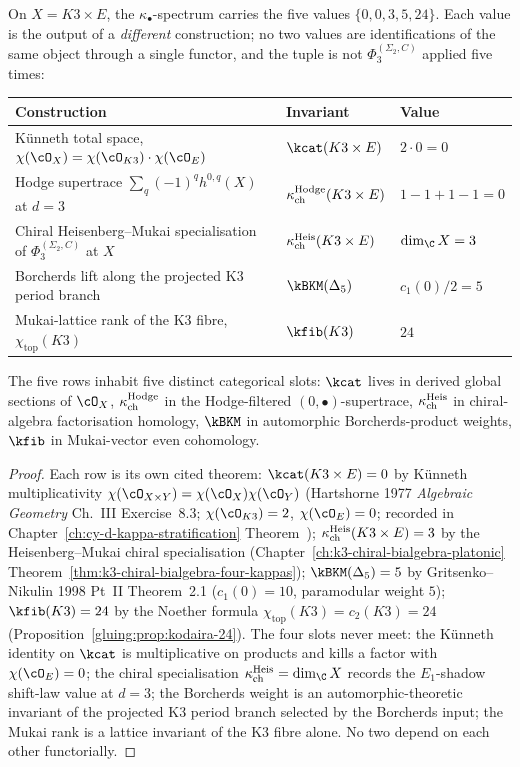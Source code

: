 \begin{theorem}
\label{gluing:thm:four-kappa-spectrum}
On $X = K3 \times E$, the $\kappa_{\bullet}$-spectrum carries the
five values $\{0, 0, 3, 5, 24\}$. Each value is the output of a
\emph{different} construction; no two values are identifications of
the same object through a single functor, and the tuple is not
$\Phi_3^{(\Sigma_2, C)}$ applied five times:
\begin{center}
\begin{tabular}{|l|l|l|}
\hline
Construction & Invariant & Value \\ \hline
K\"unneth total space, $\chi(\cO_X) = \chi(\cO_{K3}) \cdot
\chi(\cO_E)$ & $\kcat(K3 \times E)$ & $2 \cdot 0 = 0$ \\
Hodge supertrace $\sum_q (-1)^q h^{0,q}(X)$ at $d = 3$ &
$\kappa_{\mathrm{ch}}^{\mathrm{Hodge}}(K3 \times E)$ & $1 - 1 + 1 - 1 = 0$ \\
Chiral Heisenberg--Mukai specialisation of $\Phi_3^{(\Sigma_2, C)}$ at $X$ &
$\kappa_{\mathrm{ch}}^{\mathrm{Heis}}(K3 \times E)$ & $\dim_\C X = 3$ \\
Borcherds lift along the projected K3 period branch &
$\kBKM(\Delta_5)$ & $c_1(0)/2 = 5$ \\
Mukai-lattice rank of the K3 fibre, $\chi_{\mathrm{top}}(K3)$ &
$\kfib(K3)$ & $24$ \\ \hline
\end{tabular}
\end{center}
The five rows inhabit five distinct categorical slots:
$\kcat$ lives in derived global sections of $\cO_X$, $\kappa_{\mathrm{ch}}^{\mathrm{Hodge}}$
in the Hodge-filtered $(0, \bullet)$-supertrace, $\kappa_{\mathrm{ch}}^{\mathrm{Heis}}$ in
chiral-algebra factorisation homology, $\kBKM$ in automorphic
Borcherds-product weights, $\kfib$ in Mukai-vector even cohomology.
\end{theorem}

\begin{proof}
Each row is its own cited theorem:
$\kcat(K3 \times E) = 0$ by K\"unneth multiplicativity
$\chi(\cO_{X \times Y}) = \chi(\cO_X) \chi(\cO_Y)$
(Hartshorne 1977 \emph{Algebraic Geometry} Ch.~III Exercise~8.3;
$\chi(\cO_{K3}) = 2$, $\chi(\cO_E) = 0$; recorded in
Chapter~\ref{ch:cy-d-kappa-stratification}
Theorem~\cite{VolI});
$\kappa_{\mathrm{ch}}^{\mathrm{Heis}}(K3 \times E) = 3$ by the Heisenberg--Mukai
chiral specialisation
(Chapter~\ref{ch:k3-chiral-bialgebra-platonic}
Theorem~\ref{thm:k3-chiral-bialgebra-four-kappas});
$\kBKM(\Delta_5) = 5$ by Gritsenko--Nikulin 1998 Pt~II Theorem~2.1
($c_1(0) = 10$, paramodular weight $5$);
$\kfib(K3) = 24$ by the Noether formula $\chi_{\mathrm{top}}(K3) =
c_2(K3) = 24$ (Proposition~\ref{gluing:prop:kodaira-24}).
The four slots never meet: the K\"unneth identity on $\kcat$ is
multiplicative on products and kills a factor with $\chi(\cO_E) =
0$; the chiral specialisation $\kch^{\mathrm{Heis}} = \dim_\C X$
records the $E_1$-shadow shift-law value at $d = 3$; the Borcherds
weight is an automorphic-theoretic invariant of the projected K3
period branch selected by the Borcherds input; the Mukai rank is a
lattice invariant of the K3 fibre alone. No two depend on each other
functorially.
\end{proof}

